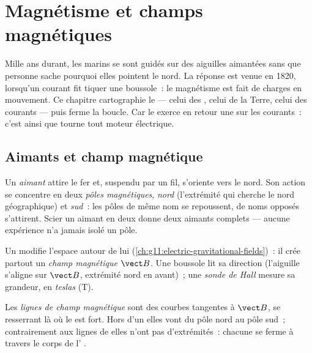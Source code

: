 \chapter{Magnétisme et champs magnétiques}\label{ch:g11:magnetic-fields}

Mille ans durant, les marins se sont guidés sur des aiguilles
aimantées sans que personne sache pourquoi elles pointent le nord. La
réponse est venue en 1820, lorsqu'un courant fit tiquer une boussole~:
le magnétisme est fait de charges en mouvement. Ce chapitre
cartographie le  --- celui des
, celui de la Terre, celui des courants ---
puis ferme la boucle. Car le 
exerce en retour une  sur les courants~: c'est ainsi que tourne
tout moteur électrique.

\section{Aimants et champ magnétique}

\begin{definition}\label{def:g11:magnetic-fields:magnet}
Un \emph{aimant} attire le fer et, suspendu par un fil,
s'oriente vers le nord. Son action se concentre en deux \emph{pôles
magnétiques}, \emph{nord} (l'extrémité qui
cherche le nord géographique) et \emph{sud}~: les pôles de même nom se
repoussent, de noms opposés s'attirent. Scier un aimant en deux donne
deux aimants complets --- aucune expérience n'a jamais isolé un pôle.
\end{definition}

\begin{definition}\label{def:g11:magnetic-fields:bfield}
Un  modifie l'espace autour de
lui (\cref{ch:g11:electric-gravitational-fields})~: il crée partout un
\emph{champ magnétique} $\vect B$. Une boussole
lit sa direction (l'aiguille s'aligne sur $\vect B$, extrémité nord en
avant)~; une \emph{sonde de Hall} mesure sa
grandeur, en \emph{teslas} (\unit{T}).
\end{definition}

\begin{definition}\label{def:g11:magnetic-fields:lines}
Les \emph{lignes de champ magnétique}
sont des courbes tangentes à $\vect B$, se resserrant là où le
 est fort. Hors d'un
 elles vont du pôle nord au pôle
sud~; contrairement aux lignes de
 elles n'ont
pas d'extrémités~: chacune se ferme à travers le corps de l'
.
\end{definition}

